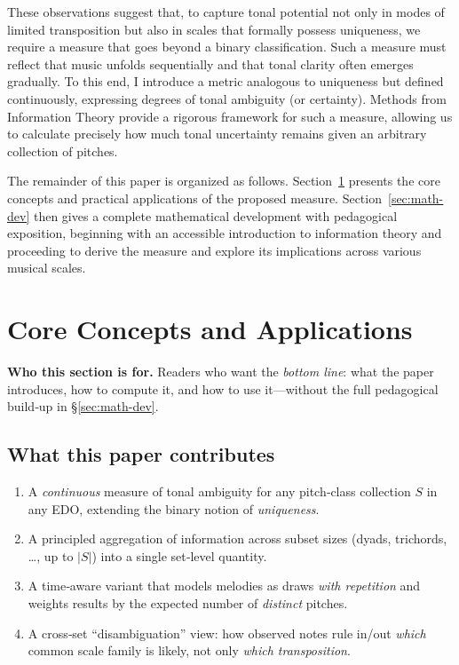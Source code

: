 \documentclass[10pt,twocolumn]{article}
\numberwithin{equation}{section} %
\begin{document}
    These observations suggest that, to capture tonal potential not only in modes of limited transposition but also in scales that formally possess uniqueness, we require a measure that goes beyond a binary classification.
    Such a measure must reflect that music unfolds sequentially and that tonal clarity often emerges gradually.
    To this end, I introduce a metric analogous to uniqueness but defined continuously, expressing degrees of tonal ambiguity (or certainty).
    Methods from Information Theory provide a rigorous framework for such a measure, allowing us to calculate precisely how much tonal uncertainty remains given an arbitrary collection of pitches.

    The remainder of this paper is organized as follows.
    Section~\ref{sec:core} presents the core concepts and practical applications of the proposed measure.
    Section~\ref{sec:math-dev} then gives a complete mathematical development with pedagogical exposition, beginning with an accessible introduction to information theory and proceeding to derive the measure and explore its implications across various musical scales.


    \section{Core Concepts and Applications}\label{sec:core}

    \noindent\textbf{Who this section is for.}
    Readers who want the \emph{bottom line}: what the paper introduces, how to compute it, and how to use it—without the full pedagogical build‑up in \S\ref{sec:math-dev}.

    \subsection*{What this paper contributes}
    \begin{enumerate}
        \item A \emph{continuous} measure of tonal ambiguity for any pitch‑class collection $S$ in any EDO, extending the binary notion of \emph{uniqueness}.
        \item A principled aggregation of information across subset sizes (dyads, trichords, \dots, up to $|S|$) into a single set‑level quantity.
        \item A time‑aware variant that models melodies as draws \emph{with repetition} and weights results by the expected number of \emph{distinct} pitches.
        \item A cross‑set ``disambiguation'' view: how observed notes rule in/out \emph{which} common scale family is likely, not only \emph{which transposition}.
    \end{enumerate}
\end{document}
